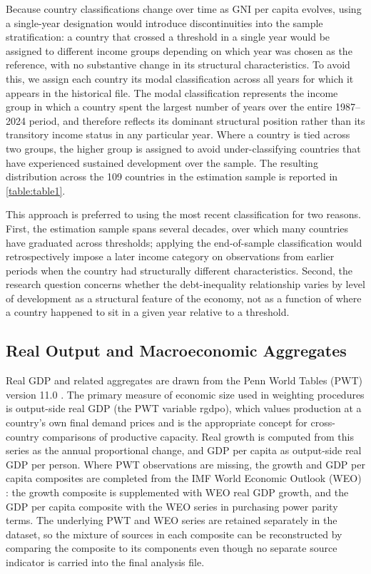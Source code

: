 \documentclass[12pt, titlepage]{article}
\numberwithin{equation}{section}
\begin{document}
Because country classifications change over time as GNI per capita evolves,
using a single-year designation would introduce discontinuities into the
sample stratification: a country that crossed a threshold in a single year
would be assigned to different income groups depending on which year was
chosen as the reference, with no substantive change in its structural
characteristics. To avoid this, we assign each country its modal
classification across all years for which it appears in the historical file.
The modal classification represents the income group in which a country spent
the largest number of years over the entire 1987--2024 period, and therefore
reflects its dominant structural position rather than its transitory income
status in any particular year. Where a country is tied across two groups, the
higher group is assigned to avoid under-classifying countries that have
experienced sustained development over the sample. The resulting distribution
across the 109 countries in the estimation sample is reported in
\autoref{table:table1}.

This approach is preferred to using the most recent classification for two
reasons. First, the estimation sample spans several decades, over which many
countries have graduated across thresholds; applying the end-of-sample
classification would retrospectively impose a later income category on
observations from earlier periods when the country had structurally different
characteristics. Second, the research question concerns whether the
debt-inequality relationship varies by level of development as a structural
feature of the economy, not as a function of where a country happened to sit
in a given year relative to a threshold.

\subsection{Real Output and Macroeconomic Aggregates}

Real GDP and related aggregates are drawn from the Penn World Tables (PWT)
version 11.0 \citep{FeenstraInklaarTimmer2015}. The primary measure of
economic size used in weighting procedures is output-side real GDP (the PWT
variable rgdpo), which values production at a country's own final demand
prices and is the appropriate concept for cross-country comparisons of
productive capacity. Real growth is computed from this series as the annual
proportional change, and GDP per capita as output-side real GDP per person.
Where PWT observations are missing, the growth and GDP per capita composites
are completed from the IMF World Economic Outlook (WEO) \citep{IMFWEO2023}:
the growth composite is supplemented with WEO real GDP growth, and the GDP
per capita composite with the WEO series in purchasing power parity terms.
The underlying PWT and WEO series are retained separately in the dataset, so
the mixture of sources in each composite can be reconstructed by comparing
the composite to its components even though no separate source indicator is
carried into the final analysis file.
\end{document}
